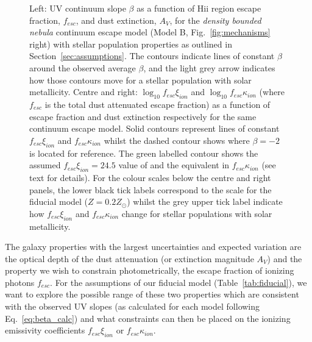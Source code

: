 \begin{figure}
  \caption{Left: UV continuum slope $\beta$ as a function of {\sc Hii} region escape fraction, $f_{esc}$, and dust extinction, $A_{V}$, for the \emph{density bounded nebula} continuum escape model (Model B, Fig.~\ref{fig:mechanisms} right) with stellar population properties as outlined in Section~\ref{sec:assumptions}. The contours indicate lines of constant $\beta$ around the observed average $\beta$, and the light grey arrow indicates how those contours move for a stellar population with solar metallicity. Centre and right: $\log_{10}f_{esc}\xi_{ion}$ and $\log_{10}f_{esc}\kappa_{ion}$ (where $f_{esc}$ is the total dust attenuated escape fraction) as a function of escape fraction and dust extinction respectively for the same continuum escape model. Solid contours represent lines of constant $f_{esc}\xi_{ion}$ and $f_{esc}\kappa_{ion}$ whilst the dashed contour shows where $\beta = -2$ is located for reference. The green labelled contour shows the assumed $f_{esc}\xi_{ion} = 24.5$ value of \citet{Robertson:2013ji} and the equivalent in $f_{esc}\kappa_{ion}$ (see text for details). For the colour scales below the centre and right panels, the lower black tick labels correspond to the scale for the fiducial model ($Z = 0.2 Z_{\odot}$) whilst the grey upper tick label indicate how $f_{esc}\xi_{ion}$ and $f_{esc}\kappa_{ion}$ change for stellar populations with solar metallicity.}
  \label{fig:fesc_dens}
\end{figure}

The galaxy properties with the largest uncertainties and expected variation are the optical depth of the dust attenuation (or extinction magnitude $A_{V}$)  and the property we wish to constrain photometrically, the escape fraction of ionizing photons $f_{esc}$. For the assumptions of our fiducial model (Table~\ref{tab:fiducial}), we want to explore the possible range of these two properties which are consistent with the observed UV slopes (as calculated for each model following Eq.~\ref{eq:beta_calc}) and what constraints can then be placed on the ionizing emissivity coefficients $f_{esc}\xi_{ion}$ or $f_{esc}\kappa_{ion}$.

